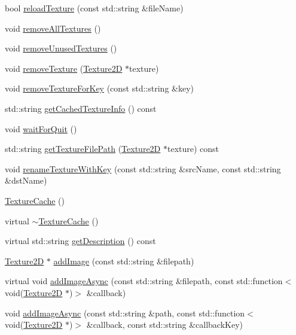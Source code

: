 \begin{DoxyCompactItemize}
\item 
bool \hyperlink{classTextureCache_a6063d9bceafa8a6f60c498f8e2c15b4a}{reload\+Texture} (const std\+::string \&file\+Name)
\item 
void \hyperlink{classTextureCache_a860e0ed7bd403b85e91cec4b03057d61}{remove\+All\+Textures} ()
\item 
void \hyperlink{classTextureCache_acbec791c5421295c030e097716787f68}{remove\+Unused\+Textures} ()
\item 
void \hyperlink{classTextureCache_a346fc925fda0b7964bbb57f100275760}{remove\+Texture} (\hyperlink{classTexture2D}{Texture2D} $\ast$texture)
\item 
void \hyperlink{classTextureCache_ad532b26bf9a162d34710aa38f776c134}{remove\+Texture\+For\+Key} (const std\+::string \&key)
\item 
std\+::string \hyperlink{classTextureCache_ab0aaf8d7d614ba1d5dcfac8ed7e1c4b2}{get\+Cached\+Texture\+Info} () const
\item 
void \hyperlink{classTextureCache_ae51af522306e9449d772c3996509a509}{wait\+For\+Quit} ()
\item 
std\+::string \hyperlink{classTextureCache_a4dd4a314af856fd66bb10b53a61fd0ea}{get\+Texture\+File\+Path} (\hyperlink{classTexture2D}{Texture2D} $\ast$texture) const
\item 
void \hyperlink{classTextureCache_a8735ea61a274834e6b3db7165ce2c26d}{rename\+Texture\+With\+Key} (const std\+::string \&src\+Name, const std\+::string \&dst\+Name)
\item 
\hyperlink{classTextureCache_aaec6e0e3c0b4c5bfed1c31187cea44c4}{Texture\+Cache} ()
\item 
virtual \hyperlink{classTextureCache_a711da38733f62e7d36346e750fa92666}{$\sim$\+Texture\+Cache} ()
\item 
virtual std\+::string \hyperlink{classTextureCache_a1e4fd2c1e7bf821300b2bf23e6c70561}{get\+Description} () const
\item 
\hyperlink{classTexture2D}{Texture2D} $\ast$ \hyperlink{classTextureCache_a95d8fe88c5a3c5ac20627861d5ac7033}{add\+Image} (const std\+::string \&filepath)
\item 
virtual void \hyperlink{classTextureCache_ac97620a31dc4c03c26d0206b6e834ff2}{add\+Image\+Async} (const std\+::string \&filepath, const std\+::function$<$ void(\hyperlink{classTexture2D}{Texture2D} $\ast$)$>$ \&callback)
\item 
void \hyperlink{classTextureCache_af36a764b691191f78fb76cc20aa8c80d}{add\+Image\+Async} (const std\+::string \&path, const std\+::function$<$ void(\hyperlink{classTexture2D}{Texture2D} $\ast$)$>$ \&callback, const std\+::string \&callback\+Key)

\end{DoxyCompactItemize}
